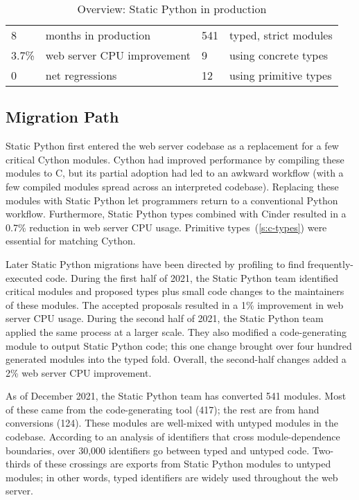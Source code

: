 \documentclass[english,cleveref,submission]{programming}
\newcommand{\SP}{Static Python}
\newcommand{\CPUchange}{3.7\%}
\begin{document}
\begin{table}
  \caption{Overview: \SP{} in production}
  \label{t:prod-stat}
  \begin{tabular}{l@{~~}l@{\qquad}l@{~~}l}
    8     & months in production   & 541   & typed, strict modules \\
    \CPUchange{} & web server CPU improvement &   9   & using concrete types \\
    0     & net regressions        &  12   & using primitive types \\
  \end{tabular}
\end{table}


\subsection{Migration Path}

\SP{} first entered the web server codebase as a replacement for a
few critical Cython modules.
Cython had improved performance by compiling these modules to C,
but its partial adoption had led to an awkward workflow (with a
few compiled modules spread across an interpreted codebase).
Replacing these modules with \SP{} let programmers return to a conventional
Python workflow.
Furthermore, \SP{} types combined with Cinder resulted in a
0.7\% reduction in web server CPU usage.
Primitive types~(\cref{s:c-types}) were essential for matching Cython.

Later \SP{} migrations have been directed by profiling to find frequently-executed code.
During the first half of 2021, the \SP{} team identified critical
modules and proposed types plus small code changes to the maintainers of these modules.
The accepted proposals resulted in a 1\% improvement in web server CPU usage.
During the second half of 2021, the \SP{} team applied the same
process at a larger scale.
They also modified a code-generating module to output \SP{} code;
this one change brought over four hundred generated modules into the typed fold.
Overall, the second-half changes added a 2\% web server CPU improvement.

As of December 2021, the \SP{} team has converted 541 modules.
Most of these came from the code-generating tool (417); the rest
are from hand conversions (124).
These modules are well-mixed with untyped modules in the codebase.
According to an analysis of identifiers that cross module-dependence
boundaries, over 30,000 identifiers go between typed and untyped code.
Two-thirds of these crossings are exports from \SP{} modules
to untyped modules; in other words, typed identifiers are widely used
throughout the web server.
\end{document}

